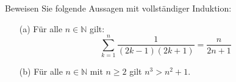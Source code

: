 Beweisen Sie folgende Aussagen mit vollständiger Induktion:

\begin{enumerate}
    \item[(a)] Für alle \( n \in \mathbb{N} \) gilt:
    \[
    \sum_{k=1}^{n} \frac{1}{(2k-1)(2k+1)} = \frac{n}{2n+1}
    \]

    \item[(b)] Für alle \( n \in \mathbb{N} \) mit \( n \geq 2 \) gilt \( n^3 > n^2 + 1 \).
\end{enumerate}